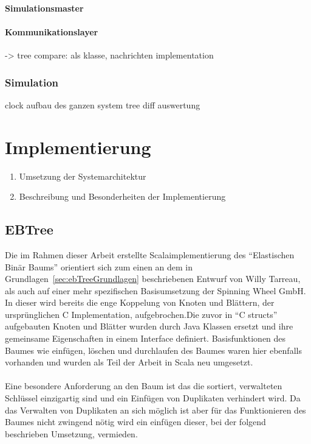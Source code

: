 \documentclass[a4paper,11pt,oneside,%
headsepline,												%
footsepline,												%
bibtotocnumbered									%
]{scrreprt}
\begin{document}
\subsubsection{Simulationsmaster}
\subsubsection{Kommunikationslayer}

-> tree compare: als klasse, nachrichten implementation	
		
\subsection{Simulation}
clock
aufbau des ganzen system
tree diff
auswertung
\chapter{Implementierung}
		\begin{enumerate}[1.]
			\item Umsetzung der Systemarchitektur
			\item Beschreibung und Besonderheiten der Implementierung
		\end{enumerate}

\section{EBTree} %
Die im Rahmen dieser Arbeit erstellte Scalaimplementierung des \enquote{Elastischen Binär Baums} orientiert sich zum einen an dem in Grundlagen~\ref{sec:ebTreeGrundlagen} beschriebenen Entwurf von Willy Tarreau\autocite{Tarreau}, als auch auf einer mehr spezifischen Basisumsetzung der Spinning Wheel GmbH.\\
In dieser wird bereits die enge Koppelung von Knoten und Blättern, der ursprünglichen C Implementation, aufgebrochen.Die zuvor in \enquote{C structs} aufgebauten Knoten und Blätter wurden durch Java Klassen ersetzt und ihre gemeinsame Eigenschaften in einem Interface definiert. Basisfunktionen des Baumes wie einfügen, löschen und durchlaufen des Baumes waren hier ebenfalls vorhanden und wurden als Teil der Arbeit in Scala neu umgesetzt.\\\\
Eine besondere Anforderung an den Baum ist das die sortiert, verwalteten Schlüssel einzigartig sind und ein Einfügen von Duplikaten verhindert wird. Da das Verwalten von Duplikaten an sich möglich ist aber für das Funktionieren des Baumes nicht zwingend nötig wird ein einfügen dieser, bei der folgend beschrieben Umsetzung, vermieden. \\
\end{document}
